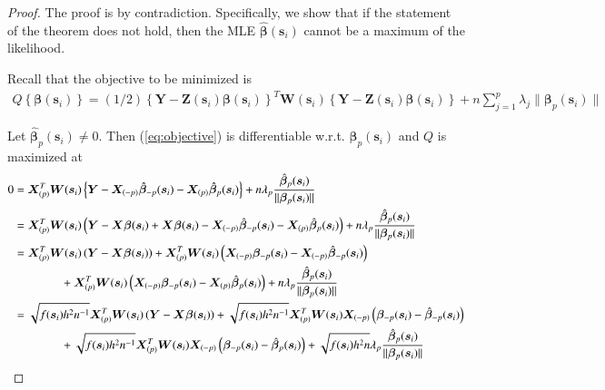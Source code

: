 \documentclass[authoryear, review, 11pt]{elsarticle}
\begin{document}
    \begin{proof}
      The proof is by contradiction. Specifically, we show that if the statement of the theorem does not hold, then the MLE $\hat{\bm{\beta}}(\bm{s}_i)$ cannot be a maximum of the likelihood.
      
      Recall that the objective to be minimized is
      \begin{align}\label{eq:objective}
        Q \left\{ \bm{\beta}(\bm{s}_i) \right\} = (1/2) \left\{ \bm{Y} - \bm{Z}(\bm{s}_i) \bm{\beta}(\bm{s}_i) \right\}^T \bm{W}(\bm{s}_i) \left\{ \bm{Y} - \bm{Z}(\bm{s}_i) \bm{\beta}(\bm{s}_i) \right\} + n \sum_{j=1}^p \lambda_j \| \bm{\beta}_p(\bm{s}_i) \|
      \end{align}

      Let $\hat{\bm{\beta}}_p(\bm{s}_i) \ne 0$. Then (\ref{eq:objective}) is differentiable w.r.t. $\bm{\beta}_p(\bm{s}_i)$ and $Q$ is maximized at
      \begin{align}\label{eq:selection}
        0 &= \bm{X}_{(p)}^T \bm{W}(\bm{s}_i) \left\{ \bm{Y} - \bm{X}_{(-p)} \hat{\bm{\beta}}_{-p}(\bm{s}_i) - \bm{X}_{(p)} \hat{\bm{\beta}}_p(\bm{s}_i) \right\} + n \lambda_p \frac{ \hat{\bm{\beta}}_p(\bm{s}_i) }{\| \bm{\beta}_p(\bm{s}_i) \|} \notag \\
        &= \bm{X}_{(p)}^T \bm{W}(\bm{s}_i) \left( \bm{Y} - \bm{X} \bm{\beta}(\bm{s}_i) + \bm{X} \bm{\beta}(\bm{s}_i) -  \bm{X}_{(-p)} \hat{\bm{\beta}}_{-p}(\bm{s}_i) - \bm{X}_{(p)} \hat{\bm{\beta}}_p(\bm{s}_i) \right) + n \lambda_p \frac{ \hat{\bm{\beta}}_p(\bm{s}_i) }{\| \bm{\beta}_p(\bm{s}_i) \|} \notag \\
        &= \bm{X}_{(p)}^T \bm{W}(\bm{s}_i) \left( \bm{Y} - \bm{X} \bm{\beta}(\bm{s}_i) \right) + \bm{X}_{(p)}^T \bm{W}(\bm{s}_i) \left( \bm{X}_{(-p)} \bm{\beta}_{-p}(\bm{s}_i) - \bm{X}_{(-p)} \hat{\bm{\beta}}_{-p}(\bm{s}_i) \right) \notag \\
        &\mkern+72mu+ \bm{X}_{(p)}^T \bm{W}(\bm{s}_i) \left( \bm{X}_{(-p)} \bm{\beta}_{-p}(\bm{s}_i) - \bm{X}_{(p)} \hat{\bm{\beta}}_p(\bm{s}_i) \right) + n \lambda_p \frac{ \hat{\bm{\beta}}_p(\bm{s}_i) }{\| \bm{\beta}_p(\bm{s}_i) \|} \notag \\
        &= \sqrt{f(\bm{s}_i) h^2 n^{-1}} \bm{X}_{(p)}^T \bm{W}(\bm{s}_i) \left( \bm{Y} - \bm{X} \bm{\beta}(\bm{s}_i) \right) + \sqrt{f(\bm{s}_i) h^2 n^{-1}} \bm{X}_{(p)}^T  \bm{W}(\bm{s}_i) \bm{X}_{(-p)} \left( \bm{\beta}_{-p}(\bm{s}_i) - \hat{\bm{\beta}}_{-p}(\bm{s}_i) \right) \notag \\
        &\mkern+72mu+ \sqrt{f(\bm{s}_i) h^2 n^{-1}} \bm{X}_{(p)}^T \bm{W}(\bm{s}_i) \bm{X}_{(-p)} \left( \bm{\beta}_{-p}(\bm{s}_i) - \hat{\bm{\beta}}_p(\bm{s}_i) \right) + \sqrt{f(\bm{s}_i) h^2 n} \lambda_p \frac{ \hat{\bm{\beta}}_p(\bm{s}_i) }{\| \bm{\beta}_p(\bm{s}_i) \|} \notag \\

\end{align}
\end{proof}
\end{document}
